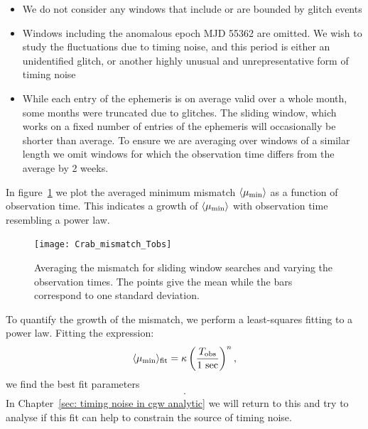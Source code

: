 \documentclass[../full_thesis/full_thesis.tex]{subfiles}
\newcommand{\thisdir}{../timing_noise_in_CGW}
\begin{document}
\begin{itemize}
    \item We do not consider any windows that
    include or are bounded by glitch events

    \item Windows including the anomalous epoch MJD 55362 are omitted. We
    wish to study the fluctuations due to timing noise, and this
    period is either an unidentified glitch, or another highly unusual and
    unrepresentative form of timing noise

   \item While each entry of the ephemeris is on average valid over a whole
   month, some months were truncated due to glitches. The sliding window, which
   works on a fixed number of entries of the ephemeris will occasionally be
   shorter than average. To ensure we are averaging over windows of a
   similar length we omit windows for which the observation time differs from
   the average by 2 weeks.

\end{itemize}

In figure~\ref{fig: mismatch Tobs} we plot the averaged minimum
mismatch $\langle\mu_{\mathrm{min}}\rangle$ as a function of observation time.
This indicates a growth of $\langle\mu_{\mathrm{min}}\rangle$ with observation time
resembling a power law.
\begin{figure}[ht]
\centering
\texttt{[image: Crab\_mismatch\_Tobs]}
\caption{Averaging the mismatch for sliding window searches and varying the
observation times. The points give the mean while the bars correspond to one
standard deviation.}
\label{fig: mismatch Tobs}
\end{figure}

To quantify the growth of the mismatch, we perform a least-squares fitting
to a power law. Fitting the expression:
\begin{equation}
\langle\mu_{\mathrm{min}}\rangle_{\textrm{fit}} = \kappa
                                   \left(\frac{T_{\mathrm{obs}}}{1\textrm{ sec}}\right)^{n},
\end{equation}
we find the best fit parameters
\begin{align}
    .
    \label{eqn: fit values}
\end{align}
In Chapter~\ref{sec: timing noise in cgw analytic} we will return to this
and try to analyse if this fit can help to constrain the source of timing noise.
\end{document}
